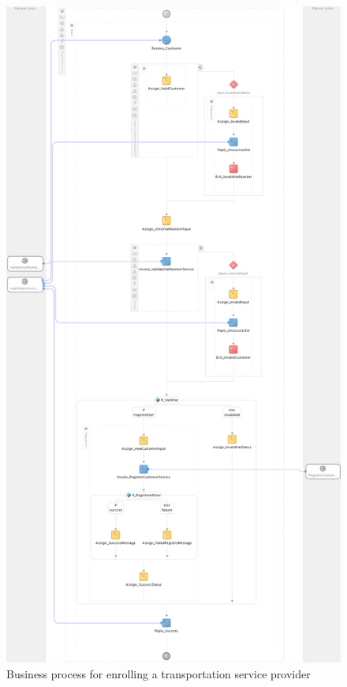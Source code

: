 \documentclass[runningheads,a4]{llncs}
\begin{document}
\begin{figure}
  \centering
  \includegraphics[height=\textheight]{img/bpel-customer.png}
  \caption{Business process for enrolling a transportation service provider}
  \label{fig:bpel.customer}
\end{figure}
\end{document}
